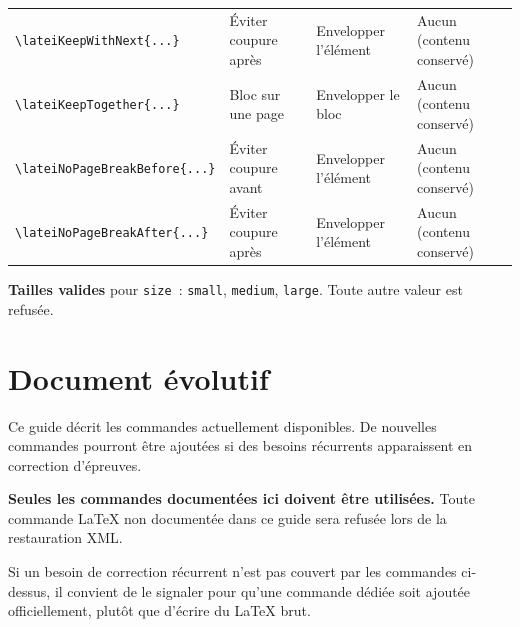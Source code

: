 \documentclass[11pt,a4paper]{article}
\newcommand{\cmd}[1]{\texttt{\textbackslash #1}}
\begin{document}
\begin{longtable}{@{}L{0.30\textwidth}L{0.22\textwidth}L{0.22\textwidth}L{0.18\textwidth}@{}}
		\cmd{lateiKeepWithNext\{...\}}
		& Éviter coupure après
		& Envelopper l'élément
		& Aucun (contenu conservé) \\[0.4em]
		
		\cmd{lateiKeepTogether\{...\}}
		& Bloc sur une page
		& Envelopper le bloc
		& Aucun (contenu conservé) \\[0.4em]
		
		\cmd{lateiNoPageBreakBefore\{...\}}
		& Éviter coupure avant
		& Envelopper l'élément
		& Aucun (contenu conservé) \\[0.4em]
		
		\cmd{lateiNoPageBreakAfter\{...\}}
		& Éviter coupure après
		& Envelopper l'élément
		& Aucun (contenu conservé) \\
		
	\end{longtable}
	\normalsize
	
	\noindent\textbf{Tailles valides} pour \texttt{size}~: \texttt{small},
	\texttt{medium}, \texttt{large}. Toute autre valeur est refusée.
	
	\section{Document évolutif}
	
	Ce guide décrit les commandes actuellement disponibles. De nouvelles
	commandes pourront être ajoutées si des besoins récurrents apparaissent
	en correction d'épreuves.
	
	\textbf{Seules les commandes documentées ici doivent être utilisées.}
	Toute commande LaTeX non documentée dans ce guide sera refusée lors de
	la restauration XML.
	
	Si un besoin de correction récurrent n'est pas couvert par les commandes
	ci-dessus, il convient de le signaler pour qu'une commande dédiée soit
	ajoutée officiellement, plutôt que d'écrire du LaTeX brut.
	
\end{document}
